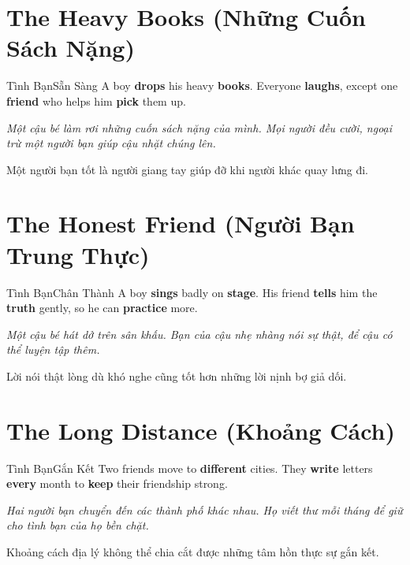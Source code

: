 \section{The Heavy Books (Những Cuốn Sách Nặng)}
\begin{truyen}{Tình Bạn}{Sẵn Sàng}
A boy \textbf{drops} his heavy \textbf{books}. Everyone \textbf{laughs}, except one \textbf{friend} who helps him \textbf{pick} them up.

\textit{Một cậu bé làm rơi những cuốn sách nặng của mình. Mọi người đều cười, ngoại trừ một người bạn giúp cậu nhặt chúng lên.}

\begin{baihoc}
Một người bạn tốt là người giang tay giúp đỡ khi người khác quay lưng đi.
\end{baihoc}
\end{truyen}

\section{The Honest Friend (Người Bạn Trung Thực)}
\begin{truyen}{Tình Bạn}{Chân Thành}
A boy \textbf{sings} badly on \textbf{stage}. His friend \textbf{tells} him the \textbf{truth} gently, so he can \textbf{practice} more.

\textit{Một cậu bé hát dở trên sân khấu. Bạn của cậu nhẹ nhàng nói sự thật, để cậu có thể luyện tập thêm.}

\begin{baihoc}
Lời nói thật lòng dù khó nghe cũng tốt hơn những lời nịnh bợ giả dối.
\end{baihoc}
\end{truyen}

\section{The Long Distance (Khoảng Cách)}
\begin{truyen}{Tình Bạn}{Gắn Kết}
Two friends move to \textbf{different} cities. They \textbf{write} letters \textbf{every} month to \textbf{keep} their friendship strong.

\textit{Hai người bạn chuyển đến các thành phố khác nhau. Họ viết thư mỗi tháng để giữ cho tình bạn của họ bền chặt.}

\begin{baihoc}
Khoảng cách địa lý không thể chia cắt được những tâm hồn thực sự gắn kết.
\end{baihoc}
\end{truyen}

